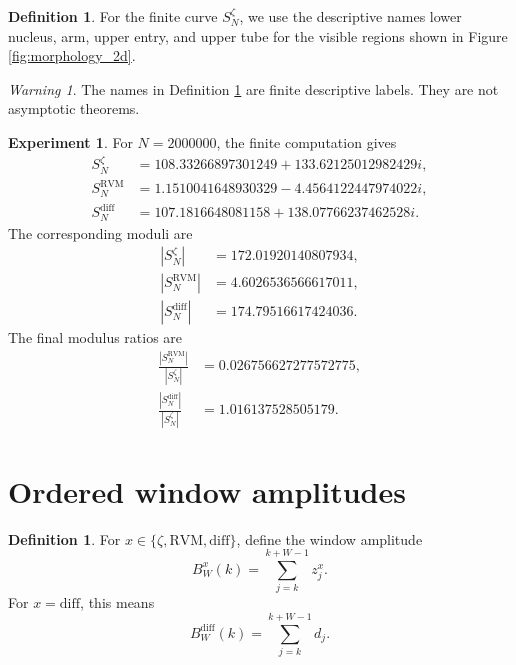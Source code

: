 \documentclass[11pt]{amsart}
\numberwithin{equation}{section}
\theoremstyle{plain}
\theoremstyle{definition}
\newtheorem{definition}[theorem]{Definition}
\newtheorem{experiment}[theorem]{Experiment}
\theoremstyle{remark}
\newtheorem{warning}[theorem]{Warning}
\newcommand{\RVM}{\mathrm{RVM}}
\newcommand{\diff}{\mathrm{diff}}
\begin{document}
\begin{definition}
\label{def:descriptive_geometric_regions}
For the finite curve \(S_N^\zeta\), we use the descriptive names lower nucleus, arm, upper entry, and upper tube for the visible regions shown in Figure \ref{fig:morphology_2d}.
\end{definition}

\begin{warning}
\label{warn:finite_geometry_names}
The names in Definition \ref{def:descriptive_geometric_regions} are finite descriptive labels.  They are not asymptotic theorems.
\end{warning}

\begin{experiment}
\label{exp:final_cumulative_values}
For \(N=2000000\), the finite computation gives
\begin{align}
S_N^\zeta
&=
108.33266897301249+133.62125012982429i,
\label{eq:exp_final_zeta_value}
\\
S_N^{\RVM}
&=
1.1510041648930329-4.4564122447974022i,
\label{eq:exp_final_rvm_value}
\\
S_N^{\diff}
&=
107.1816648081158+138.07766237462528i.
\label{eq:exp_final_diff_value}
\end{align}
The corresponding moduli are
\begin{align}
|S_N^\zeta|
&=
172.01920140807934,
\label{eq:exp_final_zeta_modulus}
\\
|S_N^{\RVM}|
&=
4.6026536566617011,
\label{eq:exp_final_rvm_modulus}
\\
|S_N^{\diff}|
&=
174.79516617424036.
\label{eq:exp_final_diff_modulus}
\end{align}
The final modulus ratios are
\begin{align}
\frac{|S_N^{\RVM}|}{|S_N^\zeta|}
&=
0.026756627277572775,
\label{eq:exp_final_rvm_ratio}
\\
\frac{|S_N^{\diff}|}{|S_N^\zeta|}
&=
1.016137528505179.
\label{eq:exp_final_diff_ratio}
\end{align}
\end{experiment}

\section{Ordered window amplitudes}
\label{sec:ordered_window_amplitudes}

\begin{definition}
\label{def:window_amplitude}
For \(x\in\{\zeta,\RVM,\diff\}\), define the window amplitude
\begin{equation}
B_W^x(k)
=
\sum_{j=k}^{k+W-1}z_j^x.
\label{eq:def_window_amplitude}
\end{equation}
For \(x=\diff\), this means
\begin{equation}
B_W^{\diff}(k)
=
\sum_{j=k}^{k+W-1}d_j.
\label{eq:def_residual_window_amplitude}
\end{equation}
\end{definition}
\end{document}
